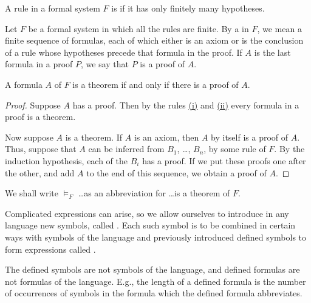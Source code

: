 A rule in a formal system $F$ is  if it has only finitely many hypotheses.


Let $F$ be a formal system in which all the rules are finite.
By a  in $F$, we mean a finite sequence of formulas, each of which either is an axiom or is the conclusion of a rule whose hypotheses precede that formula in the proof.
If $A$ is the last formula in a proof $P$, we say that $P$ is a proof of $A$.

\begin{theorem}
A formula $A$ of $F$ is a theorem if and only if there is a proof of $A$.
\end{theorem}

\begin{proof}
Suppose $A$ has a proof.
Then by the rules \hyperref[axioms are theorems]{(i)} and \hyperref[inductions are theorems]{(ii)} every formula in a proof is a theorem.

Now suppose $A$ is a theorem.
If $A$ is an axiom, then $A$ by itself is a proof of $A$.
Thus, suppose that $A$ can be inferred from $B_1$, \ldots, $B_n$, by some rule of $F$.
By the induction hypothesis, each of the $B_i$ has a proof.
If we put these proofs one after the other, and add $A$ to the end of this sequence, we obtain a proof of $A$.
\end{proof}

\begin{remark}
We shall write $\models_F$ \ldots as an abbreviation for \ldots is a theorem of $F$.
\end{remark}

Complicated expressions can arise, so we allow ourselves to introduce in any language new symbols, called .
Each such symbol is to be combined in certain ways with symbols of the language and previously introduced defined symbols to form expressions called .

\begin{remark}
The defined symbols are not symbols of the language, and defined formulas are not formulas of the language. E.g., the length of a defined formula is the number of occurrences of symbols in the formula which the defined formula abbreviates.
\end{remark}


